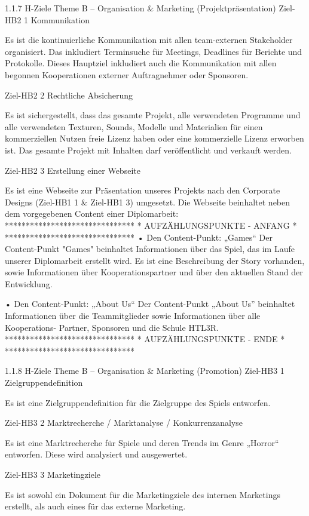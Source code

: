 1.1.7	H-Ziele Theme B – Organisation & Marketing (Projektpräsentation)
Ziel-HB2 1	Kommunikation

Es ist die kontinuierliche Kommunikation mit allen team-externen Stakeholder organisiert. Das inkludiert Terminsuche für Meetings, Deadlines für Berichte und Protokolle. Dieses Hauptziel inkludiert auch die Kommunikation mit allen begonnen Kooperationen externer Auftragnehmer oder Sponsoren.


	Ziel-HB2 2 	Rechtliche Absicherung

Es ist sichergestellt, dass das gesamte Projekt, alle verwendeten Programme und alle verwendeten Texturen, Sounds, Modelle und Materialien für einen kommerziellen Nutzen freie Lizenz haben oder eine kommerzielle Lizenz erworben ist. Das gesamte Projekt mit Inhalten darf veröffentlicht und verkauft werden.

	Ziel-HB2 3 	Erstellung einer Webseite

Es ist eine Webseite zur Präsentation unseres Projekts nach den Corporate Designs (Ziel-HB1 1 & Ziel-HB1 3) umgesetzt. Die Webseite beinhaltet neben dem vorgegebenen Content einer Diplomarbeit:
		 *******************************
		 *  AUFZÄHLUNGSPUNKTE - ANFANG *
		 *******************************
•	Den Content-Punkt: „Games“
Der Content-Punkt "Games" beinhaltet Informationen über das Spiel, das im Laufe unserer Diplomarbeit erstellt wird. Es ist eine Beschreibung der Story vorhanden, sowie Informationen über Kooperationspartner und über den aktuellen Stand der Entwicklung.

•	Den Content-Punkt: „About Us“
Der Content-Punkt „About Us” beinhaltet Informationen über die Teammitglieder sowie Informationen über alle Kooperations- Partner, Sponsoren und die Schule HTL3R.
		 *******************************
		 *  AUFZÄHLUNGSPUNKTE - ENDE   *
		 *******************************


1.1.8	H-Ziele Theme B – Organisation & Marketing (Promotion)
Ziel-HB3 1	Zielgruppendefinition

Es ist eine Zielgruppendefinition für die Zielgruppe des Spiels entworfen.

Ziel-HB3 2	Marktrecherche / Marktanalyse / Konkurrenzanalyse

Es ist eine Marktrecherche für Spiele und deren Trends im Genre „Horror“ entworfen. Diese wird analysiert und ausgewertet.

Ziel-HB3 3	Marketingziele

Es ist sowohl ein Dokument für die Marketingziele des internen Marketings erstellt, als auch eines für das externe Marketing.

